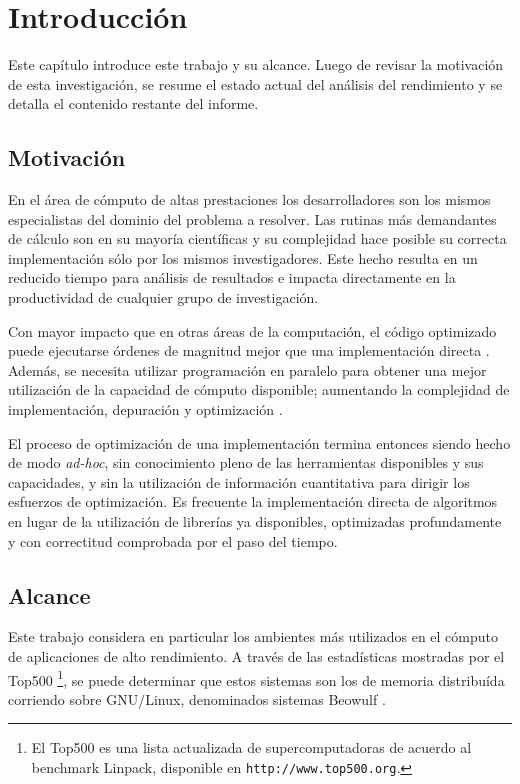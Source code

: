 \documentclass[a4paper]{report}
\begin{document}
\tableofcontents

\chapter{Introducci\'on}

Este cap\'itulo introduce este trabajo y su alcance. Luego de revisar la
motivaci\'on de esta investigaci\'on, se resume el estado actual del an\'alisis
del rendimiento y se detalla el contenido restante del informe.

\section{Motivaci\'on}

En el \'area de c\'omputo de altas prestaciones los desarrolladores son los mismos
especialistas del dominio del problema a resolver. Las rutinas
m\'as demandantes de c\'alculo son en su mayor\'ia cient\'ificas y su
complejidad hace posible su correcta implementaci\'on s\'{o}lo por los mismos investigadores.
Este hecho resulta en un reducido tiempo para an\'alisis de resultados
e impacta directamente en la productividad de cualquier grupo de investigaci\'on.

\bigskip

Con mayor impacto que en otras \'areas de la computaci\'on, el c\'odigo
optimizado puede ejecutarse \'ordenes de magnitud mejor que una implementaci\'on
directa \cite{mm-matrixmultiplicationtool}. Adem\'as, se necesita utilizar
programaci\'on en paralelo para obtener una mejor utilizaci\'on de la
capacidad de c\'omputo disponible; aumentando la complejidad de implementaci\'on, depuraci\'on y
optimizaci\'on \cite{parallel-programming}.

\bigskip

El proceso de optimizaci\'on de una implementaci\'on termina entonces siendo
hecho de modo {\it ad-hoc}, sin conocimiento pleno de las herramientas disponibles y
sus capacidades, y sin la utilizaci\'on de informaci\'on cuantitativa para dirigir los
esfuerzos de optimizaci\'on. Es frecuente la implementaci\'on directa
de algoritmos en lugar de la utilizaci\'on de librer\'ias ya disponibles, optimizadas
profundamente y con correctitud comprobada por el paso del tiempo.

\section{Alcance}

Este trabajo considera en particular los ambientes m\'as utilizados en
el c\'omputo de aplicaciones de alto rendimiento. A trav\'es de las
estad\'isticas mostradas por el Top500 \footnote{El Top500 es una lista actualizada de supercomputadoras
de acuerdo al benchmark Linpack, disponible en {\tt http://www.top500.org}.}, se
puede determinar que estos sistemas son los de memoria distribu\'ida corriendo sobre
GNU/Linux, denominados sistemas Beowulf \cite{beowulf}.
\end{document}
